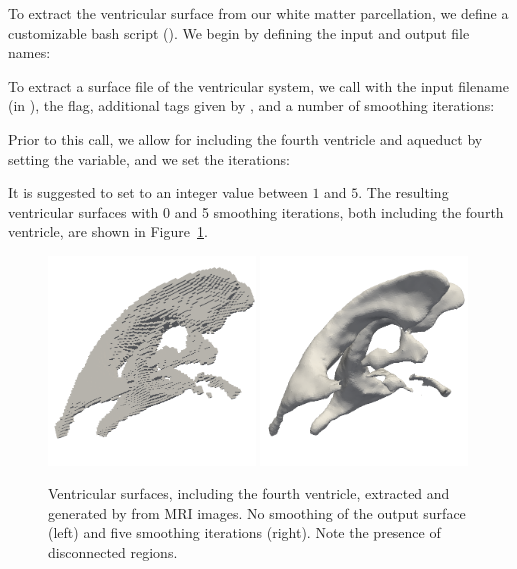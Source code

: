 To extract the ventricular surface from our white matter parcellation,
we define a customizable bash script (). We begin by defining the input and output file names:


\noindent To extract a surface file of the ventricular system, we call
 with the input filename (in ), the  flag, additional tags given by , and a number of smoothing iterations:


\noindent Prior to this call, we allow for including the fourth
ventricle and aqueduct by setting the  variable, and
we set the  iterations:


\noindent It is suggested to set  to an
integer value between $1$ and $5$. The resulting ventricular surfaces
with 0 and 5 smoothing iterations, both including the fourth
ventricle, are shown in
Figure~\ref{fig:chp4:ernie-ventricles-smoothing-example}.
\begin{figure}
  \includegraphics[width=0.49\textwidth]{./chapters/chp4/FIG/ernie-vent-0smooth.png}
  \includegraphics[width=0.49\textwidth]{./chapters/chp4/FIG/ernie-vent-5smooth.png}
  \caption{Ventricular surfaces, including the fourth ventricle,
    extracted and generated by \freesurfer{} from MRI images. No
    smoothing of the output surface (left) and five smoothing
    iterations (right). Note the presence of disconnected regions.}
  \label{fig:chp4:ernie-ventricles-smoothing-example}
\end{figure}

